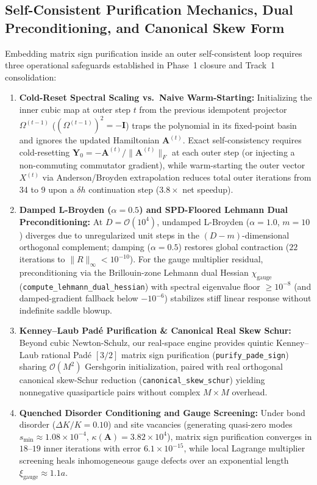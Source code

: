 \subsection{Self-Consistent Purification Mechanics, Dual Preconditioning, and Canonical Skew Form}
Embedding matrix sign purification inside an outer self-consistent loop requires three operational safeguards established in Phase~1 closure and Track~1 consolidation:
\begin{enumerate}
\item \textbf{Cold-Reset Spectral Scaling vs.\ Naive Warm-Starting:} Initializing the inner cubic map at outer step $t$ from the previous idempotent projector $\Omega^{(t-1)}$ ($(\Omega^{(t-1)})^2 = -\mathbf{I}$) traps the polynomial in its fixed-point basin and ignores the updated Hamiltonian $\mathbf{A}^{(t)}$. Exact self-consistency requires cold-resetting $\mathbf{Y}_0 = -\mathbf{A}^{(t)}/\|\mathbf{A}^{(t)}\|_F$ at each outer step (or injecting a non-commuting commutator gradient), while warm-starting the outer vector $X^{(t)}$ via Anderson/Broyden extrapolation reduces total outer iterations from 34 to 9 upon a $\delta h$ continuation step ($3.8\times$ net speedup).
\item \textbf{Damped L-Broyden ($\alpha = 0.5$) and SPD-Floored Lehmann Dual Preconditioning:} At $D = \mathcal{O}(10^4)$, undamped L-Broyden ($\alpha = 1.0$, $m = 10$) diverges due to unregularized unit steps in the $(D - m)$-dimensional orthogonal complement; damping ($\alpha = 0.5$) restores global contraction ($22$ iterations to $\|R\|_\infty < 10^{-10}$). For the gauge multiplier residual, preconditioning via the Brillouin-zone Lehmann dual Hessian $\chi_{\mathrm{gauge}}$ (\texttt{compute\_lehmann\_dual\_hessian}) with spectral eigenvalue floor $\ge 10^{-8}$ (and damped-gradient fallback below $-10^{-6}$) stabilizes stiff linear response without indefinite saddle blowup.
\item \textbf{Kenney--Laub Pad\'e Purification \& Canonical Real Skew Schur:} Beyond cubic Newton-Schulz, our real-space engine provides quintic Kenney--Laub rational Pad\'e $[3/2]$ matrix sign purification (\texttt{purify\_pade\_sign}) sharing $\mathcal{O}(M^2)$ Gershgorin initialization, paired with real orthogonal canonical skew-Schur reduction (\texttt{canonical\_skew\_schur}) yielding nonnegative quasiparticle pairs without complex $M \times M$ overhead.
\item \textbf{Quenched Disorder Conditioning and Gauge Screening:} Under bond disorder ($\Delta K / K = 0.10$) and site vacancies (generating quasi-zero modes $s_{\min} \approx 1.08 \times 10^{-4}$, $\kappa(\mathbf{A}) = 3.82 \times 10^4$), matrix sign purification converges in $18\text{--}19$ inner iterations with error $6.1 \times 10^{-15}$, while local Lagrange multiplier screening heals inhomogeneous gauge defects over an exponential length $\xi_{\mathrm{gauge}} \approx 1.1 a$.
\end{enumerate}
